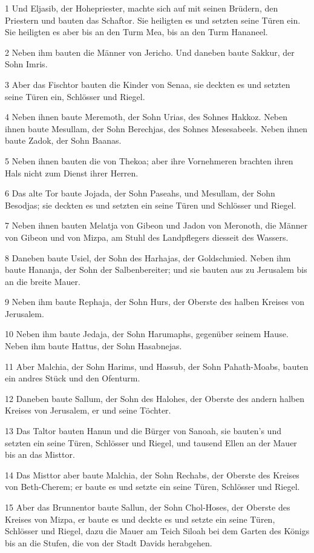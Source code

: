 \par 1 Und Eljasib, der Hohepriester, machte sich auf mit seinen Brüdern, den Priestern und bauten das Schaftor. Sie heiligten es und setzten seine Türen ein. Sie heiligten es aber bis an den Turm Mea, bis an den Turm Hananeel.
\par 2 Neben ihm bauten die Männer von Jericho. Und daneben baute Sakkur, der Sohn Imris.
\par 3 Aber das Fischtor bauten die Kinder von Senaa, sie deckten es und setzten seine Türen ein, Schlösser und Riegel.
\par 4 Neben ihnen baute Meremoth, der Sohn Urias, des Sohnes Hakkoz. Neben ihnen baute Mesullam, der Sohn Berechjas, des Sohnes Mesesabeels. Neben ihnen baute Zadok, der Sohn Baanas.
\par 5 Neben ihnen bauten die von Thekoa; aber ihre Vornehmeren brachten ihren Hals nicht zum Dienst ihrer Herren.
\par 6 Das alte Tor baute Jojada, der Sohn Paseahs, und Mesullam, der Sohn Besodjas; sie deckten es und setzten ein seine Türen und Schlösser und Riegel.
\par 7 Neben ihnen bauten Melatja von Gibeon und Jadon von Meronoth, die Männer von Gibeon und von Mizpa, am Stuhl des Landpflegers diesseit des Wassers.
\par 8 Daneben baute Usiel, der Sohn des Harhajas, der Goldschmied. Neben ihm baute Hananja, der Sohn der Salbenbereiter; und sie bauten aus zu Jerusalem bis an die breite Mauer.
\par 9 Neben ihm baute Rephaja, der Sohn Hurs, der Oberste des halben Kreises von Jerusalem.
\par 10 Neben ihm baute Jedaja, der Sohn Harumaphs, gegenüber seinem Hause. Neben ihm baute Hattus, der Sohn Hasabnejas.
\par 11 Aber Malchia, der Sohn Harims, und Hassub, der Sohn Pahath-Moabs, bauten ein andres Stück und den Ofenturm.
\par 12 Daneben baute Sallum, der Sohn des Halohes, der Oberste des andern halben Kreises von Jerusalem, er und seine Töchter.
\par 13 Das Taltor bauten Hanun und die Bürger von Sanoah, sie bauten's und setzten ein seine Türen, Schlösser und Riegel, und tausend Ellen an der Mauer bis an das Misttor.
\par 14 Das Misttor aber baute Malchia, der Sohn Rechabs, der Oberste des Kreises von Beth-Cherem; er baute es und setzte ein seine Türen, Schlösser und Riegel.
\par 15 Aber das Brunnentor baute Sallun, der Sohn Chol-Hoses, der Oberste des Kreises von Mizpa, er baute es und deckte es und setzte ein seine Türen, Schlösser und Riegel, dazu die Mauer am Teich Siloah bei dem Garten des Königs bis an die Stufen, die von der Stadt Davids herabgehen.
